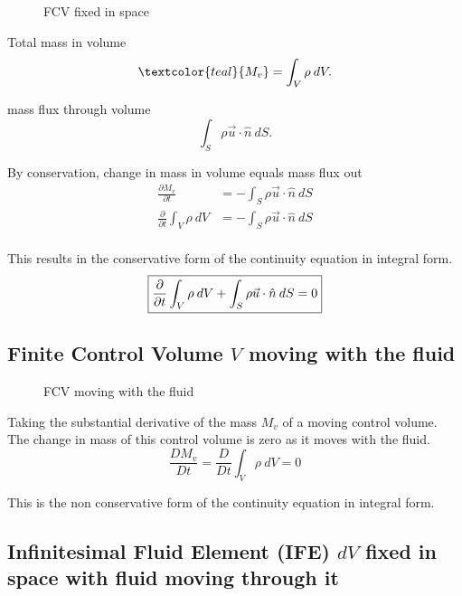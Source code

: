 \begin{figure}[ht]
    \centering
    \caption{FCV fixed in space}
    \label{fig:fcv-fixed-in-space}
\end{figure}

Total mass in volume
\[
  \textcolor{teal}{M_{v}} = \int_{V} { \rho} \: d{V}
.\] 

mass flux through volume
\[
  \int_{S} { \rho \vec{u} \cdot \hat{n}} {}  \: {dS} {}
.\]

By conservation, change in mass in volume equals mass flux out
\begin{align*}
  \frac{\partial M_{v}}{\partial t} &= - \int_{S} { \rho \vec{u} \cdot \hat{n}} {}  \: {dS} {} \\
  \frac{\partial }{\partial t} \int_{V} { \rho} \: d{V} &= - \int_{S} { \rho \vec{u} \cdot \hat{n}} {}  \: {dS} {} \\
\end{align*}

This results in the conservative form of the continuity equation in integral
form.
\begin{equation} \label{eq:F1}
  \boxed{\frac{\partial}{\partial t} \int_{V} { \rho} \: d{V} + \int_{S} { \rho \vec{u} \cdot \hat{n}} {}  \: {dS} {} = 0} \\
\end{equation}


\subsection{Finite Control Volume $V$ moving with the fluid}%

\begin{figure}[ht]
    \centering
    \caption{FCV moving with the fluid}
    \label{fig:fcv-moving-with-the-fluid}
\end{figure}

Taking the substantial derivative of the mass $M_{v}$ of a moving control
volume. The change in mass of this control volume is zero as it moves
with the fluid.
\begin{equation} \label{eq:F2}
  \frac{DM_{v}}{Dt} = \boxed{\frac{D}{Dt}\int_{V} { \rho} \: d{V} = 0}
\end{equation}

This is the non conservative form of the continuity equation in integral form.

\subsection{Infinitesimal Fluid Element (IFE) $dV$ fixed in space with fluid moving
through it}%

